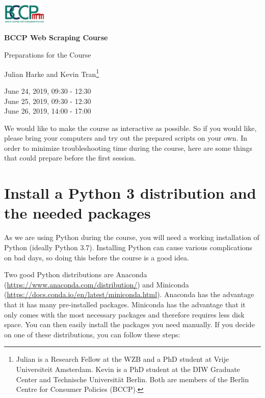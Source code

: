 \documentclass[a4paper]{article}
\begin{document}
\includegraphics[width=80px]{../misc/bccp_logo_transparent.png}
\vspace{1cm}

\begin{center}
\textbf{\Large BCCP Web Scraping Course}

{\large Preparations for the Course}
\vspace{0.3cm}

Julian Harke and Kevin Tran\footnote{Julian is a Research Fellow at the WZB and a PhD student at Vrije Universiteit Amsterdam. Kevin is a PhD student at the DIW Graduate Center and Technische Universit\"at Berlin. Both are members of the Berlin Centre for Consumer Policies (BCCP).} \vspace{0.3cm}

June 24, 2019, 09:30 - 12:30 \\
June 25, 2019, 09:30 - 12:30 \\
June 26, 2019, 14:00 - 17:00
\end{center}

We would like to make the course as interactive as possible. So if you would like, please bring your computers and try out the prepared scripts on your own. In order to minimize troubleshooting time during the course, here are some things that could prepare before the first session.

\section{Install a Python 3 distribution and the needed packages}

As we are using Python during the course, you will need a working installation of Python (ideally Python 3.7). Installing Python can cause various complications on bad days, so doing this before the course is a good idea.

Two good Python distributions are Anaconda (\url{https://www.anaconda.com/distribution/}) and Miniconda (\url{https://docs.conda.io/en/latest/miniconda.html}). Anaconda has the advantage that it has many pre-installed packages. Miniconda has the advantage that it only comes with the most necessary packages and therefore requires less disk space. You can then easily install the packages you need manually. If you decide on one of these distributions, you can follow these steps:
\end{document}
